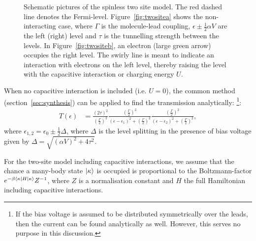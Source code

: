 \begin{figure}[h]
\begin{subfigure}[!tb]{0.48\textwidth}
    \end{subfigure}
    \caption{Schematic pictures of the spinless two site model. The red dashed line denotes the Fermi-level. Figure~\ref{fig:twositea} shows the non\hyp{}interacting case, where $\Gamma$ is the molecule-lead coupling, $\epsilon \pm \frac{1}{2} \alpha V$ are the left (right) level and $\tau$ is the tunnelling strength between the levels. In Figure~\ref{fig:twositeb}, an electron (large green arrow) occupies the right level. The swirly line is meant to indicate an interaction with electrons on the left level, thereby raising the level with the capacitive interaction or charging energy $U$.} \label{fig:twosite}
\end{figure}

When no capacitive interaction is included (i.e. $U=0$), the common method (section~\ref{sec:synthesis}) can be applied to find the transmission analytically: \cite{perrinnano}\footnote{If the bias voltage is assumed to be distributed symmetrically over the leads, then the current can be found analytically as well. However, this serves no purpose in this discussion.}:
\begin{align*}
T(\epsilon) &= \frac{ (2\tau)^2 }{(\frac{\Gamma}{2})^2} \frac{(\frac{\Gamma}{2})^2}{(\epsilon-\epsilon_1)^2 + (\frac{\Gamma}{2})^2}\frac{(\frac{\Gamma}{2})^2}{(\epsilon-\epsilon_2)^2 + (\frac{\Gamma}{2})^2},
\end{align*}
where $\epsilon_{1,2} = \epsilon_0 \pm \frac{1}{2} \Delta$, where $\Delta$ is the level splitting in the presence of bias voltage given by $\Delta = \sqrt{ (\alpha V)^2+ 4\tau^2}$. 

For the two-site model including capacitive interactions, we assume that the chance a many-body state $\ket{\kappa}$ is occupied is proportional to the Boltzmann-factor $e^{ -\beta \braket{ \kappa\left| H \right| \kappa}} Z^{-1}$, where $Z$ is a normalisation constant and $H$ the full Hamiltonian including capacitive interactions.

